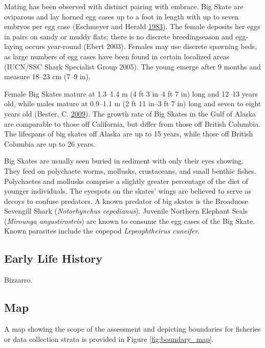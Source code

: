 \documentclass[12pt,]{article}
\begin{document}
Mating has been observed with distinct pairing with embrace. Big Skate
are oviparous and lay horned egg cases up to a foot in length with up to
seven embryos per egg case (Eschmeyer and Herald
\protect\hyperlink{ref-Eschmeyer1983}{1983}). The female deposits her
eggs in pairs on sandy or muddy flats; there is no discrete
breedingseason and egg-laying occurs year-round (Ebert 2003). Females
may use discrete spawning beds, as large numbers of egg cases have been
found in certain localized areas (IUCN/SSC Shark Specialist Group 2005).
The young emerge after 9 months and measure 18--23 cm (7--9 in).

Female Big Skates mature at 1.3--1.4 m (4 ft 3 in--4 ft 7 in) long and
12--13 years old, while males mature at 0.9--1.1 m (2 ft 11 in--3 ft 7
in) long and seven to eight years old (Bester, C.
\protect\hyperlink{ref-Bester2009}{2009}). The growth rate of Big Skates
in the Gulf of Alaska are comparable to those off California, but differ
from those off British Columbia. The lifespans of big skates off Alaska
are up to 15 years, while those off British Columbia are up to 26 years.

Big Skates are usually seen buried in sediment with only their eyes
showing. They feed on polychaete worms, mollusks, crustaceans, and small
benthic fishes. Polychaetes and mollusks comprise a slightly greater
percentage of the diet of younger individuals. The eyespots on the
skates' wings are believed to serve as decoys to confuse predators. A
known predator of big skates is the Broadnose Sevengill Shark
(\emph{Notorhynchus cepedianus}). Juvenile Northern Elephant Seals
(\emph{Mirounga angustirostris}) are known to consume the egg cases of
the Big Skate. Known parasites include the copepod \emph{Lepeophtheirus
cuneifer}.

\hypertarget{early-life-history}{%
\subsection{Early Life History}\label{early-life-history}}

Bizzarro.

\hypertarget{map}{%
\subsection{Map}\label{map}}

A map showing the scope of the assessment and depicting boundaries for
fisheries or data collection strata is provided in Figure
\ref{fig:boundary_map}.
\end{document}
